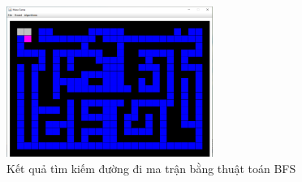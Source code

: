 \begin{figure}[h!]
	\centering
	\includegraphics[width=0.6\textwidth]{
		Figures/figs/7.PNG
	}
	\caption[Kết quả tìm kiếm đường đi ma trận bằng thuật toán BFS]{
		Kết quả tìm kiếm đường đi ma trận bằng thuật toán BFS
	}
	\label{fig:hinhn}
\end{figure}


